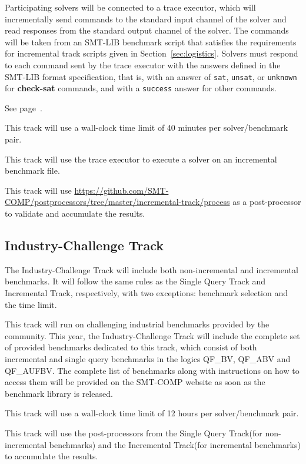 \documentclass[12pt]{article}
\newcommand{\akey}[1]{\textbf{#1}\xspace}
\newcommand{\maintrack}{Single Query Track\xspace}
\newcommand{\inctrack}{Incremental Track\xspace}
\newcommand{\challtrack}{Industry-Challenge Track\xspace}
\begin{document}
Participating solvers will be connected to a trace executor, which
will incrementally send commands to the standard input channel of the
solver and read responses from the standard output channel of the
solver.  The commands will be taken from an SMT-LIB benchmark script
that satisfies the requirements for incremental track scripts given in
Section~\ref{sec:logistics}.
%
Solvers must respond to each command sent by the trace executor with
the answers defined in the SMT-LIB format specification, that is, with
an answer of \texttt{sat}, \texttt{unsat}, or \texttt{unknown} for
\akey{check-sat} commands, and with a \texttt{success} answer for
other commands.

 See page~\pageref{benchmark-selection}.

This track will use a wall-clock time limit of 40 minutes per solver/benchmark
pair.

 This track will use the trace executor
to execute a solver on an incremental benchmark file.

This track will use
{\url{https://github.com/SMT-COMP/postprocessors/tree/master/incremental-track/process}}
as a post-processor
to validate and accumulate the results.

\subsection{\challtrack}
\label{sec:exec:industry-challenge}

The \challtrack will include both non-incremental and incremental benchmarks.
It will follow the same rules as the \maintrack and \inctrack, respectively,
with two exceptions: benchmark selection and the time limit.

This track will run on challenging industrial benchmarks provided by the
community. This year, the \challtrack will include the complete set of provided
benchmarks dedicated to this track, which consist of both incremental and
single query benchmarks in the logics QF\_BV, QF\_ABV and QF\_AUFBV. The
complete list of benchmarks along with instructions on how to access them will
be provided on the SMT-COMP website as soon as the benchmark library is
released.

This track will use a wall-clock time limit of 12 hours per solver/benchmark
pair.

This track will use the post-processors from the \maintrack (for
non-incremen\-tal benchmarks) and the \inctrack (for incremental benchmarks)
to accumulate the results.
\end{document}
